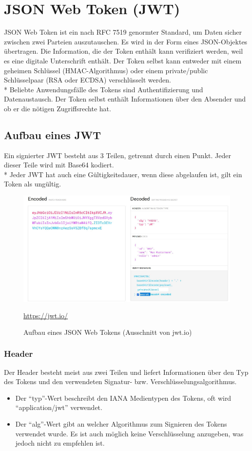 \section{JSON Web Token (JWT)}
\author{Benjamin Besic}
JSON Web Token ist ein nach RFC 7519 genormter Standard, um Daten sicher zwischen zwei Parteien auszutauschen. Es wird in der Form eines JSON-Objektes übertragen.
Die Information, die der Token enthält kann verifiziert werden, weil es eine digitale Unterschrift enthält. Der Token selbst kann entweder mit einem geheimen Schlüssel (HMAC-Algorithmus) oder einem private/public Schlüsselpaar (RSA oder ECDSA) verschlüsselt werden.\\*
Beliebte Anwendungsfälle des Tokens sind Authentifizierung und Datenaustausch. Der Token selbst enthält Informationen über den Absender und ob er die nötigen Zugriffsrechte hat.
\cite{JWTIO} \cite{JWTIONOS}
\subsection{Aufbau eines JWT}
Ein signierter JWT besteht aus 3 Teilen, getrennt durch einen Punkt. Jeder dieser Teile wird mit Base64 kodiert. \\*
Jeder JWT hat auch eine Gültigkeitsdauer, wenn diese abgelaufen ist, gilt ein Token als ungültig.
\clearpage
\begin{figure}[htp]
    \centering
    \includegraphics[scale=0.4]{pics/JWT.JPG}
    \caption{Aufbau eines JSON Web Tokens (Ausschnitt von jwt.io)}
        \small \url{https://jwt.io/}
    \label{fig:impl:JWT}
\end{figure}

\subsubsection{Header}
Der Header besteht meist aus zwei Teilen und liefert Informationen über den Typ des Tokens und den verwendeten Signatur- bzw. Verschlüsselungsalgorithmus.
\begin{itemize}
    \item Der ``typ''-Wert beschreibt den IANA Medientypen des Tokens, oft wird ``application/jwt'' verwendet.
    \item Der ``alg''-Wert gibt an welcher Algorithmus zum Signieren des Tokens verwendet wurde. Es ist auch möglich keine Verschlüsselung anzugeben, was jedoch nicht zu empfehlen ist. \cite{JWTIONOS}     
\end{itemize}
